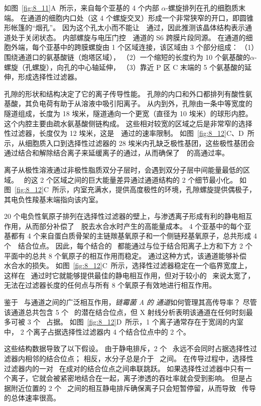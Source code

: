 如图~\ref{fig:8_11}A~所示，来自每个亚基的 4 个内部 $\alpha$-螺旋排列在孔的细胞质末端。
在通道的细胞内口处（这 4 个螺旋交叉）形成一个非常狭窄的开口，即圆锥形帐篷的“烟孔”。
因为这个孔太小而不能让~~通过，因此推测该晶体结构表示通道处于关闭状态。
内部螺旋与电压门控~~通道的 S6 跨膜片段同源。
在通道的细胞外端，每个亚基中的跨膜螺旋由 1 个区域连接，该区域由 3 个部分组成：
（1）围绕通道口的氨基酸链（炮塔区域），
（2）一个缩短的长度约为 10 个氨基酸的$\alpha$-螺旋（孔螺旋），向孔的中心轴延伸，
（3）靠近 P 区 C 末端的 5 个氨基酸的延伸，形成选择性过滤器。


孔隙的形状和结构决定了它的离子传导性能。
孔隙的内口和外口都排列有酸性氨基酸，其负电荷有助于从溶液中吸引阳离子。
从内到外，孔隙由一条中等宽度的隧道组成，长度为 18 埃米，隧道通向一个更宽（直径为 10 埃米）的球形内腔。
这个内腔主要由疏水氨基酸侧链构成。
这些相对较宽的区域之后是非常窄的选择性过滤器，长度仅为 12 埃米，这是~~通过的速率限制。
如图~\ref{fig:8_12}C、D~所示，从细胞质入口到选择性过滤器的 28 埃米内孔缺乏极性基团，这些极性基团会通过结合和解除结合离子来延缓离子的通过，从而确保了~~的高通过率。


离子从极性溶液通过非极性脂质双分子层时，会遇到双分子层中间能量最低的区域。
~的这 2 个区域之间的巨大能量差异通过通道结构的 2 个细节最小化。
如图~\ref{fig:8_12}C~所示，内室充满水，提供高度极性的环境，孔隙螺旋提供偶极子，其电负性羧基末端指向该内室。


20 个电负性氧原子排列在选择性过滤器的壁上，与渗透离子形成有利的静电相互作用，从而部分补偿了~~脱去水合水时产生的高能量成本。
4 个亚基中的每个亚基都有 4 个来自蛋白质骨架的主链羰基氧原子和一个侧链羟基氧原子，总共形成 4 个~~结合位点。
因此，每个结合的~ 都能通过与位于结合阳离子上方和下方 2 个平面中的总共 8 个氧原子的相互作用而稳定。
通过这种方式，该通道能够补偿~ 水合水的损失。
如图~\ref{fig:8_12}C~所示，选择性过滤器稳定在一个临界宽度上，这样在~ 通过时它就能够提供最佳的静电相互作用，但对于较小的~ 来说太宽了，无法在过滤器长度的任何点与所有 8 个氧原子有效地进行相互作用。


鉴于~ 与通道之间的广泛相互作用，\textit{链霉菌 A 的  通道}如何管理其高传导率？
尽管该通道总共包含 5 个~ 的潜在结合位点，但 X 射线分析表明该通道在任何时刻最多可被 3 个~ 占据。
如图~\ref{fig:8_12}D~所示，1 个离子通常存在于宽阔的内室中， 2 个离子占据选择性过滤器内 4 个结合位点中的 2 个。


这些结构数据导致了以下假设。
由于静电排斥，2 个~ 永远不会同时占据选择性过滤器内相邻的结合位点；
相反，水分子总是介于~ 之间。
在传导过程中，选择性过滤器内的一对~ 在成对的结合位点之间串联跳跃。
如果选择性过滤器中只有一个离子，它就会被紧密地结合在一起，离子渗透的吞吐率就会受到影响。
但是占据附近位置的 2 个~ 之间的相互静电排斥确保离子只会短暂停留，从而导致~ 传导的总体速率很高。


